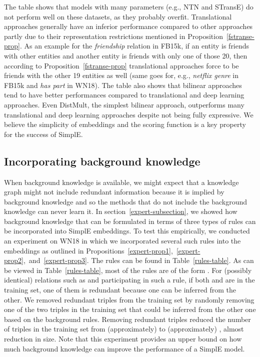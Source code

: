 \documentclass{article}
\begin{document}
The table shows that models with many parameters (e.g., NTN and STransE) do not perform well on these datasets, as they probably overfit. Translational approaches generally have an inferior performance compared to other approaches partly due to their representation restrictions mentioned in Proposition~\ref{fstranse-prop}. As an example for the \emph{friendship} relation in FB15k, if an entity  is friends with  other entities and another entity  is friends with only one of those 20, then according to Proposition~\ref{fstranse-prop} translational approaches force  to be friends with the other 19 entities as well (same goes for, e.g., \emph{netflix genre} in FB15k and \emph{has part} in WN18). The table also shows that bilinear approaches tend to have better performances compared to translational and deep learning approaches. Even DistMult, the simplest bilinear approach, outperforms many translational and deep learning approaches despite not being fully expressive. We believe the simplicity of embeddings and the scoring function is a key property for the success of SimplE.

\subsection{Incorporating background knowledge} \label{expert-knowledge-experiment-section}
When background knowledge is available, we might expect that a knowledge graph might not include redundant information because it is implied by background knowledge and so the methods that do not include the background knowledge can never learn it.
In section~\ref{expert-subsection}, we showed how background knowledge that can be formulated in terms of three types of rules can be incorporated into SimplE embeddings. 
To test this empirically, we conducted an experiment on WN18 in which we incorporated several such rules into the embeddings as outlined in Propositions~\ref{expert-prop1},~\ref{expert-prop2},~and~\ref{expert-prop3}. The rules can be found in Table~\ref{rules-table}. 
As can be viewed in Table~\ref{rules-table}, most of the rules are of the form . For (possibly identical) relations such as  and  participating in such a rule, if both  and  are in the training set, one of them is redundant because one can be inferred from the other.
We removed redundant triples from the training set by randomly removing one of the two triples in the training set that could be inferred from the other one based on the background rules. Removing redundant triples reduced the number of triples in the training set from (approximately)  to (approximately) , almost  reduction in size. Note that this experiment provides an upper bound on how much background knowledge can improve the performance of a SimplE model.
\end{document}
